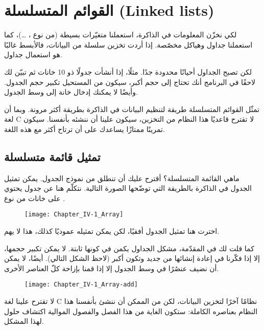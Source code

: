 \chapter{القوائم المتسلسلة (\textenglish{Linked lists})}

لكي نخزّن المعلومات في الذاكرة، استعملنا متغيّرات بسيطة (من نوع
، \dots)،
كما استعملنا جداول وهياكل مخصّصة. إذا أردت تخزين سلسلة من البيانات، فالأبسط غالبًا هو استعمال جداول. 

لكن تصبح الجداول أحيانًا محدودة جدًا. مثلًا، إذا أنشأت جدولًا ذو 10 خانات ثم تبيّن لك لاحقًا في البرنامج أنك تحتاج إلى حجم أكبر، سيكون من المستحيل تكبير حجم الجدول. وأيضًا لا يمكنك إدخال خانة إلى وسط الجدول.

تمثّل القوائم المتسلسلة طريقة لتنظيم البيانات في الذاكرة بطريقة أكثر مرونة. وبما أن لغة
\textenglish{C}
لا تقترح قاعديًا هذا النظام من التخزين، سيكون علينا أن ننشئه بأنفسنا. سيكون تمرينًا ممتازًا يساعدك على أن ترتاح أكثر مع هذه اللغة.

\section{تمثيل قائمة متسلسلة}

ماهي القائمة المتسلسلة؟ أقترح عليك أن تنطلق من نموذج الجدول. يمكن تمثيل الجدول في الذاكرة بالطريقة التي توضّحها الصورة التالية. نتكلّم هنا عن جدول يحتوي على خانات من نوع
.

\begin{figure}[H]
	\centering
	\texttt{[image: Chapter\_IV-1\_Array]}
\end{figure}

\begin{information}
اخترت هنا تمثيل الجدول أفقيًا، لكن يمكن تمثيله عموديًا كذلك، هذا لا يهم.
\end{information}


كما قلت لك في المقدّمة، مشكل الجداول يكمن في كونها ثابتة. لا يمكن تكبير حجمها، إلا إذا فكّرنا في إعادة إنشائها من جديد وتكون أكبر (لاحظ الشكل التالي). أيضًا، لا يمكن أن نضيف عنصُرًا في وسط الجدول إلا إذا قمنا بإزاحة كلّ العناصر الأخرى.

\begin{figure}[H]
	\centering
	\texttt{[image: Chapter\_IV-1\_Array-add]}
\end{figure}

لا تقترح علينا لغة
\textenglish{C}
نظامًا آخرًا لتخزين البيانات، لكن من الممكن أن ننشئ بأنفسنا هذا النظام بعناصره الكاملة: ستكون الغاية من هذا الفصل والفصول الموالية اكتشاف حلول لهذا المشكل.


